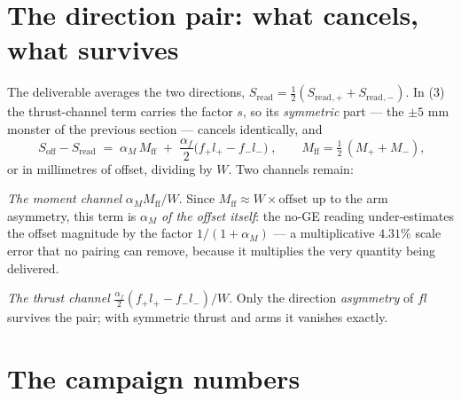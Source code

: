 \documentclass[10pt]{article}
\newcommand{\Soff}{S_{\mathrm{off}}}
\newcommand{\Sread}{S_{\mathrm{read}}}
\newcommand{\Mff}{M_{\mathrm{ff}}}
\begin{document}
\section{The direction pair: what cancels, what survives}

The deliverable averages the two directions,
$\Sread = \tfrac12(\Sread{}_{,+} + \Sread{}_{,-})$. In (3) the
thrust-channel term carries the factor $s$, so its \emph{symmetric}
part --- the $\pm 5$ mm monster of the previous section --- cancels
identically, and
\begin{equation}
  \boxed{\;\Soff - \Sread \;=\;
  \alpha_M\,\Mff \;+\; \frac{\alpha_f}{2}
  \big(f_+ l_+ - f_- l_-\big)\;}, \qquad
  \Mff = \tfrac12\,(M_+ + M_-),
  \tag{4}
\end{equation}
or in millimetres of offset, dividing by $W$. Two channels remain:

\emph{The moment channel} $\alpha_M \Mff / W$. Since
$\Mff \approx W \times \text{offset}$ up to the arm asymmetry, this
term is $\alpha_M$ \emph{of the offset itself}: the no-GE reading
under-estimates the offset magnitude by the factor $1/(1+\alpha_M)$
--- a multiplicative $4.31\%$ scale error that no pairing can
remove, because it multiplies the very quantity being delivered.

\emph{The thrust channel} $\tfrac{\alpha_f}{2}(f_+l_+ - f_-l_-)/W$.
Only the direction \emph{asymmetry} of $f l$ survives the pair; with
symmetric thrust and arms it vanishes exactly.

\section{The campaign numbers}
\end{document}

